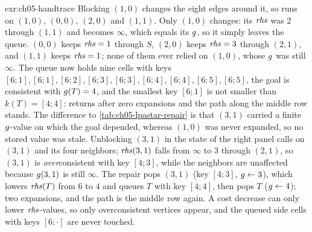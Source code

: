 \begin{solution}{exr:ch05-handtrace}
Blocking $(1,0)$ changes the eight edges around it, so \LpaUpdateVertex runs on $(1,0)$, $(0,0)$, $(2,0)$ and $(1,1)$. Only $(1,0)$ changes: its $\mathit{rhs}$ was $2$ through $(1,1)$ and becomes $\infty$, which equals its $g$, so it simply leaves the queue. $(0,0)$ keeps $\mathit{rhs}=1$ through $S$, $(2,0)$ keeps $\mathit{rhs}=3$ through $(2,1)$, and $(1,1)$ keeps $\mathit{rhs}=1$; none of them ever relied on $(1,0)$, whose $g$ was still $\infty$. The queue now holds nine cells with keys $[6;1],[6;1],[6;2],[6;3],[6;3],[6;4],[6;4],[6;5],[6;5]$, the goal is consistent with $g(T)=4$, and the smallest key $[6;1]$ is not smaller than $k(T)=[4;4]$: \LpaComputeShortestPath returns after zero expansions and the path along the middle row stands. The difference to \cref{tab:ch05-lpastar-repair} is that $(3,1)$ carried a finite $g$-value on which the goal depended, whereas $(1,0)$ was never expanded, so no stored value was stale. Unblocking $(3,1)$ in the state of the right panel calls \LpaUpdateVertex on $(3,1)$ and its four neighbors; $\mathit{rhs}(3,1)$ falls from $\infty$ to $3$ through $(2,1)$, so $(3,1)$ is \emph{over}consistent with key $[4;3]$, while the neighbors are unaffected because $g(3,1)$ is still $\infty$. The repair pops $(3,1)$ (key $[4;3]$, $g\gets 3$), which lowers $\mathit{rhs}(T)$ from $6$ to $4$ and queues $T$ with key $[4;4]$, then pops $T$ ($g\gets 4$); two expansions, and the path is the middle row again. A cost decrease can only lower $\mathit{rhs}$-values, so only overconsistent vertices appear, and the queued side cells with keys $[6;\cdot]$ are never touched.
\end{solution}

